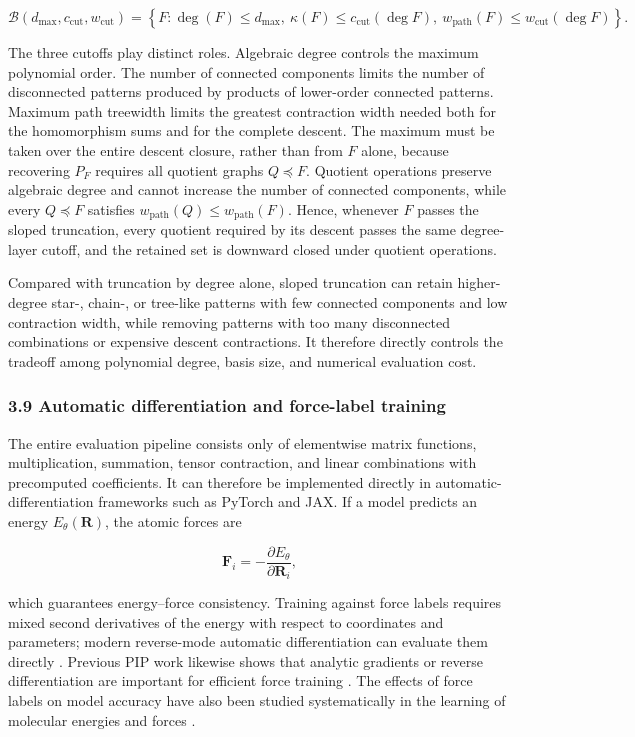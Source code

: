 \[
\mathcal B(d_{\max},c_{\mathrm{cut}},w_{\mathrm{cut}})
=
\left\{
F:
\deg(F)\le d_{\max},\
\kappa(F)\le c_{\mathrm{cut}}(\deg F),\
w_{\mathrm{path}}(F)\le w_{\mathrm{cut}}(\deg F)
\right\}.
\]

The three cutoffs play distinct roles. Algebraic degree controls the maximum polynomial order. The number of connected components limits the number of disconnected patterns produced by products of lower-order connected patterns. Maximum path treewidth limits the greatest contraction width needed both for the homomorphism sums and for the complete descent. The maximum must be taken over the entire descent closure, rather than from \(F\) alone, because recovering \(P_F\) requires all quotient graphs \(Q\preceq F\). Quotient operations preserve algebraic degree and cannot increase the number of connected components, while every \(Q\preceq F\) satisfies \(w_{\mathrm{path}}(Q)\le w_{\mathrm{path}}(F)\). Hence, whenever \(F\) passes the sloped truncation, every quotient required by its descent passes the same degree-layer cutoff, and the retained set is downward closed under quotient operations.

Compared with truncation by degree alone, sloped truncation can retain higher-degree star-, chain-, or tree-like patterns with few connected components and low contraction width, while removing patterns with too many disconnected combinations or expensive descent contractions. It therefore directly controls the tradeoff among polynomial degree, basis size, and numerical evaluation cost.

\subsubsection{3.9 Automatic differentiation and force-label training}\label{sec:automatic-differentiation}

The entire evaluation pipeline consists only of elementwise matrix functions, multiplication, summation, tensor contraction, and linear combinations with precomputed coefficients. It can therefore be implemented directly in automatic-differentiation frameworks such as PyTorch and JAX. If a model predicts an energy \(E_\theta(\mathbf R)\), the atomic forces are

\[
\mathbf F_i=-\frac{\partial E_\theta}{\partial\mathbf R_i},
\]

which guarantees energy--force consistency. Training against force labels requires mixed second derivatives of the energy with respect to coordinates and parameters; modern reverse-mode automatic differentiation can evaluate them directly \cite{Baydin2018AD}. Previous PIP work likewise shows that analytic gradients or reverse differentiation are important for efficient force training \cite{Nandi2019PIPGradients,Houston2022PIPGradients}. The effects of force labels on model accuracy have also been studied systematically in the learning of molecular energies and forces \cite{Christensen2020Gradients}.

